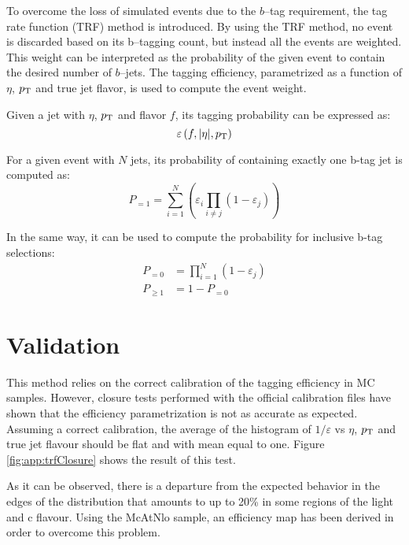 To overcome the loss of simulated events due to the $b$--tag
requirement, the tag rate function (TRF) method is introduced. By
using the TRF method, no event is discarded based on its b--tagging
count, but instead all the events are weighted.  This weight can be
interpreted as the probability of the given event to contain the
desired number of $b$--jets.  The tagging efficiency, parametrized as a
function of $\eta$, $p_{\mathrm{T}}$ and true jet flavor, is used to compute
the event weight.

Given a jet with $\eta$, $p_{\mathrm{T}}$ and flavor $f$, its tagging
probability can be expressed as:
\begin{equation*}
	\varepsilon \left(f,|\eta|,p_{\mathrm{T}}\right)
\end{equation*}

For a given event with $N$ jets, its probability of containing exactly
one b-tag jet is computed as:
\begin{equation*}
	P_{=1} = \sum\limits_{i=1}^N \left( \varepsilon_{i}
    \prod\limits_{i \neq j} \left( 1 - \varepsilon_{j} \right) \right)
\end{equation*}

In the same way, it can be used to compute the probability for
inclusive b-tag selections:
\begin{align*}
	P_{=0} &= \prod\limits_{i=1}^N \left( 1 - \varepsilon_{j} \right) \\
	P_{\geq 1} &= 1 - P_{=0}
\end{align*}

\section{Validation}
This method relies on the correct calibration of the tagging
efficiency in MC samples.  However, closure tests performed with the
official calibration files have shown that the efficiency
parametrization is not as accurate as expected.  Assuming a correct
calibration, the average of the histogram of $1/\varepsilon$ vs
$\eta$, $p_{\mathrm{T}}$ and true jet flavour should be flat and with mean equal
to one.  Figure \ref{fig:app:trfClosure} shows the result of this test.

As it can be observed, there is a departure from the expected behavior
in the edges of the distribution that amounts to up to 20\% in some
regions of the light and c flavour.  Using the McAtNlo sample, an
efficiency map has been derived in order to overcome this problem.

